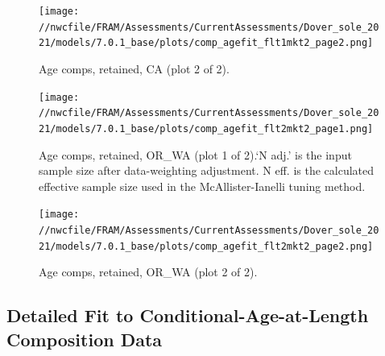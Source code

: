 \documentclass[11pt,
  english,
  a4paper,
]{article}
\begin{document}
\tagmcend\tagstructend


\begin{figure}
\centering
\texttt{[image: //nwcfile/FRAM/Assessments/CurrentAssessments/Dover\_sole\_2021/models/7.0.1\_base/plots/comp\_agefit\_flt1mkt2\_page2.png]}
\caption{Age comps, retained, CA (plot 2 of 2).\label{fig:comp_agefit_flt1mkt2_page2}}
\end{figure}

\tagmcend\tagstructend


\begin{figure}
\centering
\texttt{[image: //nwcfile/FRAM/Assessments/CurrentAssessments/Dover\_sole\_2021/models/7.0.1\_base/plots/comp\_agefit\_flt2mkt2\_page1.png]}
\caption{Age comps, retained, OR\_WA (plot 1 of 2).`N adj.' is the input sample size after data-weighting adjustment. N eff. is the calculated effective sample size used in the McAllister-Ianelli tuning method.\label{fig:comp_agefit_flt2mkt2_page1}}
\end{figure}

\tagmcend\tagstructend


\begin{figure}
\centering
\texttt{[image: //nwcfile/FRAM/Assessments/CurrentAssessments/Dover\_sole\_2021/models/7.0.1\_base/plots/comp\_agefit\_flt2mkt2\_page2.png]}
\caption{Age comps, retained, OR\_WA (plot 2 of 2).\label{fig:comp_agefit_flt2mkt2_page2}}
\end{figure}

\tagmcend\tagstructend

\clearpage


\hypertarget{detailed-caal}{%
\subsection{Detailed Fit to Conditional-Age-at-Length Composition Data}\label{detailed-caal}}
\end{document}
